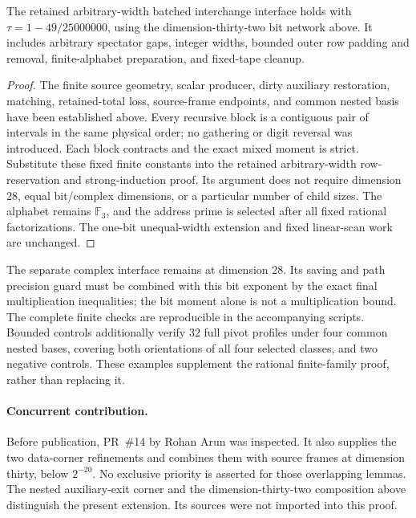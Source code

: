 \begin{lemma}
\label{lem:nested-source-interchange}
The retained arbitrary-width batched interchange interface holds with
$\tau=1-49/25000000$, using the dimension-thirty-two bit network above.
It includes arbitrary spectator gaps, integer widths, bounded outer row
padding and removal, finite-alphabet preparation, and fixed-tape cleanup.
\end{lemma}
\begin{proof}
The finite source geometry, scalar producer, dirty auxiliary restoration,
matching, retained-total loss, source-frame endpoints, and common nested
basis have been established above. Every recursive block is a contiguous
pair of intervals in the same physical order; no gathering or digit reversal
was introduced. Each block contracts and the exact mixed moment is strict.
Substitute these fixed finite constants into the retained arbitrary-width
row-reservation and strong-induction proof. Its argument does not require
dimension 28, equal bit/complex dimensions, or a particular number of child
sizes. The alphabet remains $\mathbb F_3$, and the address prime is selected
after all fixed rational factorizations. The one-bit unequal-width extension
and fixed linear-scan work are unchanged.
\end{proof}

The separate complex interface remains at dimension 28. Its saving and path
precision guard must be combined with this bit exponent by the exact final
multiplication inequalities; the bit moment alone is not a multiplication
bound. The complete finite checks are reproducible in the accompanying
scripts. Bounded controls additionally verify $32$ full pivot profiles under
four common nested bases, covering both orientations of all four selected
classes, and two negative controls. These examples supplement the rational
finite-family proof, rather than replacing it.

\paragraph{Concurrent contribution.}
Before publication, PR~\#14 by Rohan Arun was inspected. It also supplies
the two data-corner refinements and combines them with source frames at
dimension thirty, below $2^{-20}$. No exclusive priority is asserted for
those overlapping lemmas. The nested auxiliary-exit corner and the
dimension-thirty-two composition above distinguish the present extension.
Its sources were not imported into this proof.
